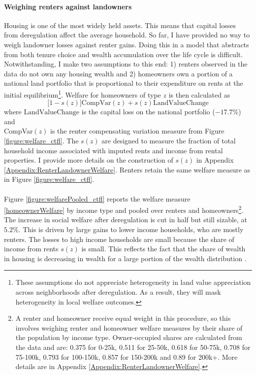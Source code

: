 \documentclass[12pt]{article}
\begin{document}
\paragraph*{Weighing renters against landowners} 

Housing is one of the most widely held assets. This means that capital losses from deregulation affect the average household. So far, I have provided no way to weigh landowner losses against renter gains. Doing this in a model that abstracts from both tenure choice and wealth accumulation over the life cycle is difficult. Notwithstanding, I make two assumptions to this end: 1) renters observed in the data do not own any housing wealth and 2) homeowners own a portion of a national land portfolio that is proportional to their expenditure on rents at the initial equilibrium\footnote{These assumptions do not appreciate  heterogeneity in land value appreciation across neighborhoods after deregulation. As a result, they will mask heterogeneity in local welfare outcomes.}. Welfare for homeowners of type $z$ is then calculated as 
\begin{equation}\label{homeownerWelfare}
	\big[1 - s(z)\big]\text{CompVar}(z) +  s(z)\text{LandValueChange}
\end{equation}
where $\text{LandValueChange}$ is the capital loss on the national portfolio ($-17.7\%$) and \\ CompVar$(z)$ is the renter compensating variation measure from Figure \ref{figure:welfare_ctfl}. The $s(z)$ are designed to measure the fraction of total household income associated with imputed rents and income from rental properties.
I provide more details on the construction of $s(z)$ in Appendix \ref{Appendix:RenterLandownerWelfare}. Renters retain the same welfare measure as in Figure \ref{figure:welfare_ctfl}. 

\paragraph*{}
Figure \ref{figure:welfarePooled_ctfl} reports the welfare measure \eqref{homeownerWelfare} by income type and pooled over renters and homeowners\footnote{A renter and homeowner receive equal weight in this procedure, so this involves weighing renter and homeowner welfare measures by their share of the population by income type. Owner-occupied shares are calculated from the data and are: 0.375 for 0-25k, 0.511 for 25-50k, 0.618 for 50-75k, 0.708 for 75-100k, 0.793 for 100-150k,  0.857 for 150-200k and 0.89 for 200k+. More details are in Appendix \ref{Appendix:RenterLandownerWelfare}.}. The increase in social welfare after deregulation is cut in half but still sizable, at $5.2 \%$. This is driven by large gains to lower income households, who are mostly renters. The losses to high income households are small because the share of income from rents $s(z)$ is small. This reflects the fact that the share of wealth in housing is decreasing in wealth for a large portion of the wealth distribution \citep{Greaney, gendergapHousing}.
\end{document}
